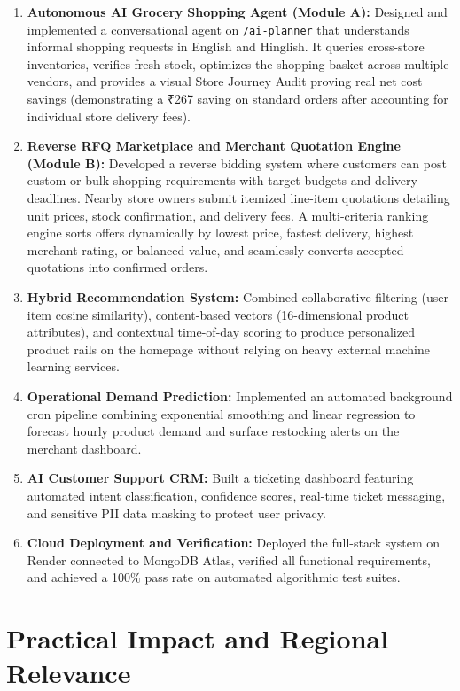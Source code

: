 \begin{enumerate}
    \item \textbf{Autonomous AI Grocery Shopping Agent (Module A):} Designed and implemented a conversational agent on \texttt{/ai-planner} that understands informal shopping requests in English and Hinglish. It queries cross-store inventories, verifies fresh stock, optimizes the shopping basket across multiple vendors, and provides a visual Store Journey Audit proving real net cost savings (demonstrating a ₹267 saving on standard orders after accounting for individual store delivery fees).
    \item \textbf{Reverse RFQ Marketplace and Merchant Quotation Engine (Module B):} Developed a reverse bidding system where customers can post custom or bulk shopping requirements with target budgets and delivery deadlines. Nearby store owners submit itemized line-item quotations detailing unit prices, stock confirmation, and delivery fees. A multi-criteria ranking engine sorts offers dynamically by lowest price, fastest delivery, highest merchant rating, or balanced value, and seamlessly converts accepted quotations into confirmed orders.
    \item \textbf{Hybrid Recommendation System:} Combined collaborative filtering (user-item cosine similarity), content-based vectors (16-dimensional product attributes), and contextual time-of-day scoring to produce personalized product rails on the homepage without relying on heavy external machine learning services.
    \item \textbf{Operational Demand Prediction:} Implemented an automated background cron pipeline combining exponential smoothing and linear regression to forecast hourly product demand and surface restocking alerts on the merchant dashboard.
    \item \textbf{AI Customer Support CRM:} Built a ticketing dashboard featuring automated intent classification, confidence scores, real-time ticket messaging, and sensitive PII data masking to protect user privacy.
    \item \textbf{Cloud Deployment and Verification:} Deployed the full-stack system on Render connected to MongoDB Atlas, verified all functional requirements, and achieved a 100\% pass rate on automated algorithmic test suites.
\end{enumerate}

\section{Practical Impact and Regional Relevance}

